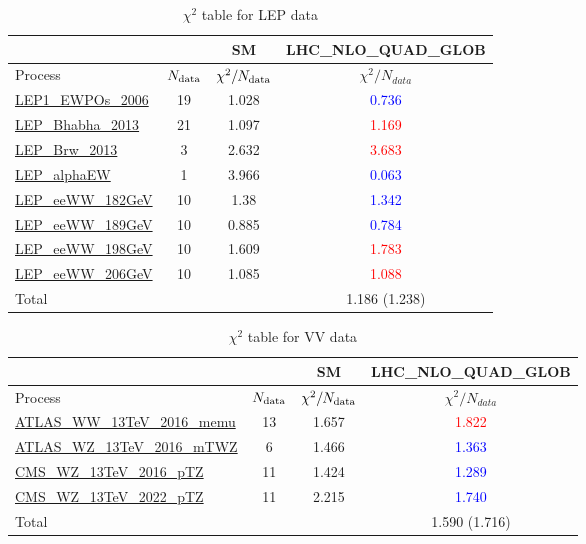 \documentclass{article}
\begin{document}
\begin{table}[H]
\centering
\begin{tabular}{|l|c|c|c|}
\hline
 \multicolumn{2}{|c|}{} & SM& LHC_NLO_QUAD_GLOB\\ \hline
Process & $N_{\rm data}$ & $\chi^ 2/N_{\rm data}$& $\chi^ 2/N_{data}$\\ \hline
\href{https://arxiv.org}{LEP1_EWPOs_2006} & 19 & 1.028 & \textcolor{blue}                            {0.736} \\ \hline
\href{https://arxiv.org}{LEP_Bhabha_2013} & 21 & 1.097 & \textcolor{red}                            {1.169} \\ \hline
\href{https://arxiv.org}{LEP_Brw_2013} & 3 & 2.632 & \textcolor{red}                            {3.683} \\ \hline
\href{https://arxiv.org}{LEP_alphaEW} & 1 & 3.966 & \textcolor{blue}                            {0.063} \\ \hline
\href{https://arxiv.org}{LEP_eeWW_182GeV} & 10 & 1.38 & \textcolor{blue}                            {1.342} \\ \hline
\href{https://arxiv.org}{LEP_eeWW_189GeV} & 10 & 0.885 & \textcolor{blue}                            {0.784} \\ \hline
\href{https://arxiv.org}{LEP_eeWW_198GeV} & 10 & 1.609 & \textcolor{red}                            {1.783} \\ \hline
\href{https://arxiv.org}{LEP_eeWW_206GeV} & 10 & 1.085 & \textcolor{red}                            {1.088} \\ \hline
\hline Total & &  & 1.186 (1.238) \\ \hline
\end{tabular}
\caption{$\chi^2$ table for LEP data}
\end{table}
\begin{table}[H]
\centering
\begin{tabular}{|l|c|c|c|}
\hline
 \multicolumn{2}{|c|}{} & SM& LHC_NLO_QUAD_GLOB\\ \hline
Process & $N_{\rm data}$ & $\chi^ 2/N_{\rm data}$& $\chi^ 2/N_{data}$\\ \hline
\href{https://arxiv.org}{ATLAS_WW_13TeV_2016_memu} & 13 & 1.657 & \textcolor{red}                            {1.822} \\ \hline
\href{https://arxiv.org}{ATLAS_WZ_13TeV_2016_mTWZ} & 6 & 1.466 & \textcolor{blue}                            {1.363} \\ \hline
\href{https://arxiv.org}{CMS_WZ_13TeV_2016_pTZ} & 11 & 1.424 & \textcolor{blue}                            {1.289} \\ \hline
\href{https://arxiv.org}{CMS_WZ_13TeV_2022_pTZ} & 11 & 2.215 & \textcolor{blue}                            {1.740} \\ \hline
\hline Total & &  & 1.590 (1.716) \\ \hline
\end{tabular}
\caption{$\chi^2$ table for VV data}
\end{table}
\end{document}
